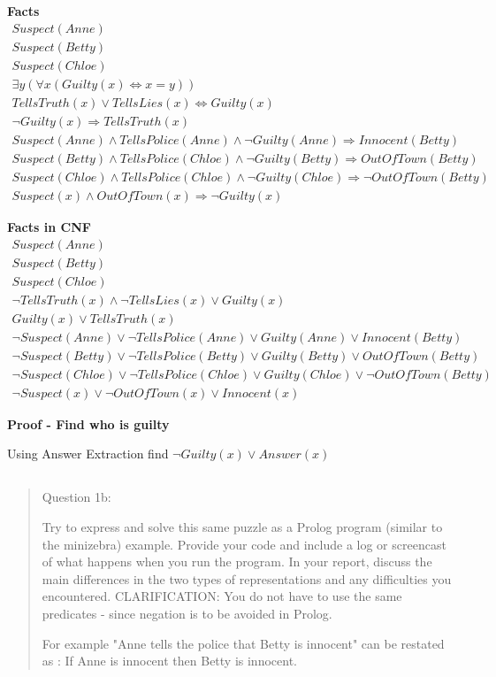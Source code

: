 \documentclass[11pt]{article}
\begin{document}
\large \textbf{Facts}
\begin{align}
Suspect(Anne) \\
Suspect(Betty) \\
Suspect(Chloe) \\
\exists y(\forall x(Guilty(x) \Leftrightarrow x=y)) \\ 
TellsTruth(x) \lor TellsLies(x) \Leftrightarrow Guilty(x) \\
\lnot Guilty(x) \Rightarrow TellsTruth(x) \\
Suspect(Anne) \land TellsPolice(Anne) \land \lnot Guilty(Anne) \Rightarrow Innocent(Betty) \\ 
Suspect(Betty) \land TellsPolice(Chloe) \land \lnot Guilty(Betty) \Rightarrow OutOfTown(Betty) \\  
Suspect(Chloe) \land TellsPolice(Chloe) \land \lnot Guilty(Chloe) \Rightarrow \lnot OutOfTown(Betty) \\  
Suspect(x) \land OutOfTown(x) \Rightarrow \lnot Guilty(x)
\end{align}

\large \textbf{Facts in CNF}
\begin{align}
Suspect(Anne) \\
Suspect(Betty) \\
Suspect(Chloe) \\ 
\lnot TellsTruth(x) \land \lnot TellsLies(x) \lor Guilty(x) \\ 
Guilty(x) \lor TellsTruth(x) \\ 
\lnot Suspect(Anne) \lor \lnot TellsPolice(Anne) \lor Guilty(Anne) \lor Innocent(Betty) \\
\lnot Suspect(Betty) \lor \lnot TellsPolice(Betty) \lor Guilty(Betty)  \lor OutOfTown(Betty) \\
\lnot Suspect(Chloe) \lor \lnot TellsPolice(Chloe) \lor Guilty(Chloe) \lor \lnot OutOfTown(Betty) \\
\lnot Suspect(x) \lor \lnot OutOfTown(x) \lor Innocent(x)
\end{align}

\textbf{Proof - Find who is guilty}

Using Answer Extraction find $\lnot Guilty(x) \lor Answer(x)$



\subsection{}
\begin{quote}
Question 1b:

Try to express and solve this same puzzle as a Prolog program (similar to the minizebra) example. Provide your code and include a log or screencast of what happens when you run the program. In your report, discuss the main differences in the two types of representations and any difficulties you encountered.
CLARIFICATION: You do not have to use the same predicates - since negation is to be avoided in Prolog.

For example  "Anne tells the police that Betty is innocent"  can be restated as : If Anne is innocent then Betty is innocent.
\end{quote}
\end{document}
